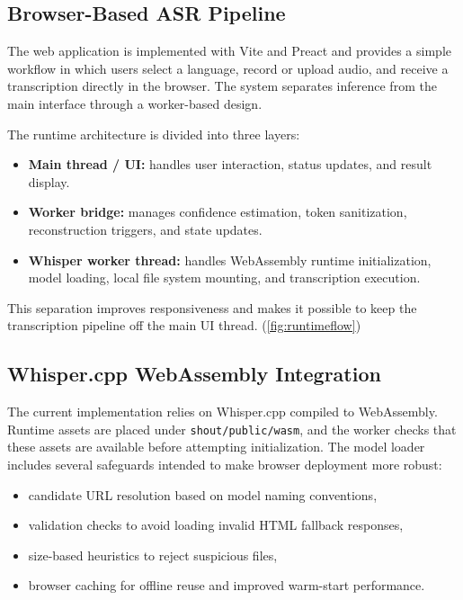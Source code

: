 \documentclass[11pt]{article}
\begin{document}



\subsection{Browser-Based ASR Pipeline}
The web application is implemented with Vite and Preact and provides a simple workflow in which users select a language, record or upload audio, and receive a transcription directly in the browser. The system separates inference from the main interface through a worker-based design.

The runtime architecture is divided into three layers:
\begin{itemize}
    \item \textbf{Main thread / UI:} handles user interaction, status updates, and result display.
    \item \textbf{Worker bridge:} manages confidence estimation, token sanitization, reconstruction triggers, and state updates.
    \item \textbf{Whisper worker thread:} handles WebAssembly runtime initialization, model loading, local file system mounting, and transcription execution.
\end{itemize}

This separation improves responsiveness and makes it possible to keep the transcription pipeline off the main UI thread. (\ref{fig:runtimeflow})

\subsection{Whisper.cpp WebAssembly Integration}
The current implementation relies on Whisper.cpp compiled to WebAssembly. Runtime assets are placed under \texttt{shout/public/wasm}, and the worker checks that these assets are available before attempting initialization. The model loader includes several safeguards intended to make browser deployment more robust:
\begin{itemize}
    \item candidate URL resolution based on model naming conventions,
    \item validation checks to avoid loading invalid HTML fallback responses,
    \item size-based heuristics to reject suspicious files,
    \item browser caching for offline reuse and improved warm-start performance.
\end{itemize}
\end{document}
